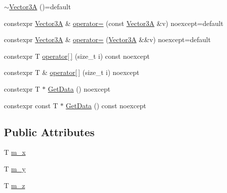 \begin{DoxyCompactItemize}
\item 
\hyperlink{structmage_1_1_vector3_a_3_01_t_00_01typename_01std_1_1enable__if__t_3_01std_1_1is__arithmetic__7070ab83646a86866d1e3c9d7eeea37a_a55cb7ee7cc304362dee2716e65c63771}{$\sim$\+Vector3A} ()=default
\item 
constexpr \hyperlink{structmage_1_1_vector3_a}{Vector3A} \& \hyperlink{structmage_1_1_vector3_a_3_01_t_00_01typename_01std_1_1enable__if__t_3_01std_1_1is__arithmetic__7070ab83646a86866d1e3c9d7eeea37a_ae3ff2b65536938b9a5ddef3b75dfdbf9}{operator=} (const \hyperlink{structmage_1_1_vector3_a}{Vector3A} \&v) noexcept=default
\item 
constexpr \hyperlink{structmage_1_1_vector3_a}{Vector3A} \& \hyperlink{structmage_1_1_vector3_a_3_01_t_00_01typename_01std_1_1enable__if__t_3_01std_1_1is__arithmetic__7070ab83646a86866d1e3c9d7eeea37a_ae8fd7a6989126c8f4b23a44edd931487}{operator=} (\hyperlink{structmage_1_1_vector3_a}{Vector3A} \&\&v) noexcept=default
\item 
constexpr T \hyperlink{structmage_1_1_vector3_a_3_01_t_00_01typename_01std_1_1enable__if__t_3_01std_1_1is__arithmetic__7070ab83646a86866d1e3c9d7eeea37a_ac41c071abc88ec86a9a1c9bf8e887326}{operator\mbox{[}$\,$\mbox{]}} (size\+\_\+t i) const noexcept
\item 
constexpr T \& \hyperlink{structmage_1_1_vector3_a_3_01_t_00_01typename_01std_1_1enable__if__t_3_01std_1_1is__arithmetic__7070ab83646a86866d1e3c9d7eeea37a_aaae2f3cde35e57c32ff0ef7cbe1aa20e}{operator\mbox{[}$\,$\mbox{]}} (size\+\_\+t i) noexcept
\item 
constexpr T $\ast$ \hyperlink{structmage_1_1_vector3_a_3_01_t_00_01typename_01std_1_1enable__if__t_3_01std_1_1is__arithmetic__7070ab83646a86866d1e3c9d7eeea37a_af069d9c1d82794b361c505aaf017b8bb}{Get\+Data} () noexcept
\item 
constexpr const T $\ast$ \hyperlink{structmage_1_1_vector3_a_3_01_t_00_01typename_01std_1_1enable__if__t_3_01std_1_1is__arithmetic__7070ab83646a86866d1e3c9d7eeea37a_ae95406c3ad724f066eddb85cd67117a3}{Get\+Data} () const noexcept
\end{DoxyCompactItemize}
\subsection*{Public Attributes}
\begin{DoxyCompactItemize}
\item 
T \hyperlink{structmage_1_1_vector3_a_3_01_t_00_01typename_01std_1_1enable__if__t_3_01std_1_1is__arithmetic__7070ab83646a86866d1e3c9d7eeea37a_a2d814b28ee9cf0bffcb63d7c1a5ee6dd}{m\+\_\+x}
\item 
T \hyperlink{structmage_1_1_vector3_a_3_01_t_00_01typename_01std_1_1enable__if__t_3_01std_1_1is__arithmetic__7070ab83646a86866d1e3c9d7eeea37a_a6bba6c15e9be995048f666bf12d78a06}{m\+\_\+y}
\item 
T \hyperlink{structmage_1_1_vector3_a_3_01_t_00_01typename_01std_1_1enable__if__t_3_01std_1_1is__arithmetic__7070ab83646a86866d1e3c9d7eeea37a_abfacda98bbb66cb12247be860f20cead}{m\+\_\+z}
\end{DoxyCompactItemize}


